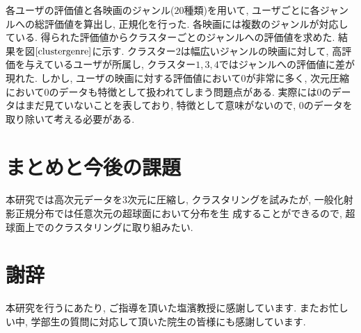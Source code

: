 \documentclass[a4paper,11pt]{jarticle}
\begin{document}
各ユーザの評価値と各映画のジャンル($20$種類)を用いて, ユーザごとに各ジャンルへの総評価値を算出し, 正規化を行った. 各映画には複数のジャンルが対応している. 得られた評価値からクラスターごとのジャンルへの評価値を求めた. 結果を図$\ref{clustergenre}$に示す. クラスター$2$は幅広いジャンルの映画に対して, 高評価を与えているユーザが所属し, クラスター$1,3,4$ではジャンルへの評価値に差が現れた. しかし, ユーザの映画に対する評価値において$0$が非常に多く, 次元圧縮において$0$のデータも特徴として扱われてしまう問題点がある. 実際には$0$のデータはまだ見ていないことを表しており, 特徴として意味がないので, $0$のデータを取り除いて考える必要がある.

\section{まとめと今後の課題}

本研究では高次元データを$3$次元に圧縮し, クラスタリングを試みたが, 一般化射影正規分布では任意次元の超球面において分布を生
成することができるので, 超球面上でのクラスタリングに取り組みたい.

\section{謝辞}

本研究を行うにあたり, ご指導を頂いた塩濱教授に感謝しています. またお忙しい中, 学部生の質問に対応して頂いた院生の皆様にも感謝しています.

\newpage
{} %

%


\end{document}
